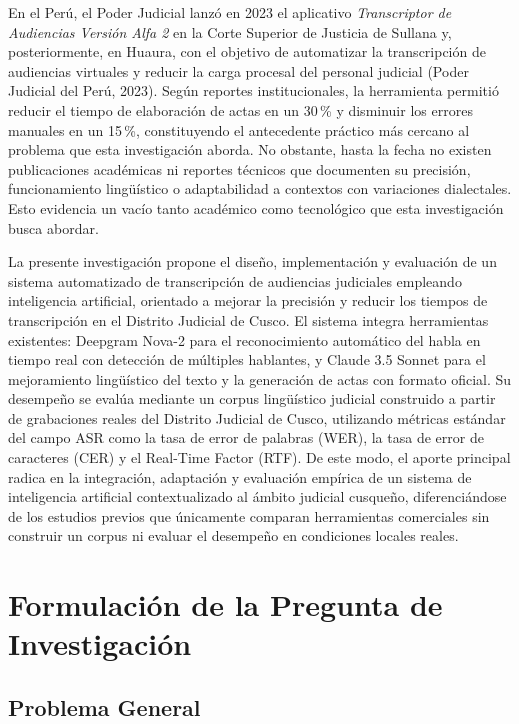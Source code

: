 \documentclass[12pt,a4paper,oneside]{report}
\begin{document}
En el Perú, el Poder Judicial lanzó en 2023 el aplicativo \textit{Transcriptor de Audiencias Versión Alfa 2} en la Corte Superior de Justicia de Sullana y, posteriormente, en Huaura, con el objetivo de automatizar la transcripción de audiencias virtuales y reducir la carga procesal del personal judicial (Poder Judicial del Perú, 2023). Según reportes institucionales, la herramienta permitió reducir el tiempo de elaboración de actas en un 30\,\% y disminuir los errores manuales en un 15\,\%, constituyendo el antecedente práctico más cercano al problema que esta investigación aborda. No obstante, hasta la fecha no existen publicaciones académicas ni reportes técnicos que documenten su precisión, funcionamiento lingüístico o adaptabilidad a contextos con variaciones dialectales. Esto evidencia un vacío tanto académico como tecnológico que esta investigación busca abordar.

La presente investigación propone el diseño, implementación y evaluación de un sistema automatizado de transcripción de audiencias judiciales empleando inteligencia artificial, orientado a mejorar la precisión y reducir los tiempos de transcripción en el Distrito Judicial de Cusco. El sistema integra herramientas existentes: Deepgram Nova-2 para el reconocimiento automático del habla en tiempo real con detección de múltiples hablantes, y Claude 3.5 Sonnet para el mejoramiento lingüístico del texto y la generación de actas con formato oficial. Su desempeño se evalúa mediante un corpus lingüístico judicial construido a partir de grabaciones reales del Distrito Judicial de Cusco, utilizando métricas estándar del campo ASR como la tasa de error de palabras (WER), la tasa de error de caracteres (CER) y el Real-Time Factor (RTF). De este modo, el aporte principal radica en la integración, adaptación y evaluación empírica de un sistema de inteligencia artificial contextualizado al ámbito judicial cusqueño, diferenciándose de los estudios previos que únicamente comparan herramientas comerciales sin construir un corpus ni evaluar el desempeño en condiciones locales reales.

\section{Formulación de la Pregunta de Investigación}

\subsection{Problema General}
\end{document}
